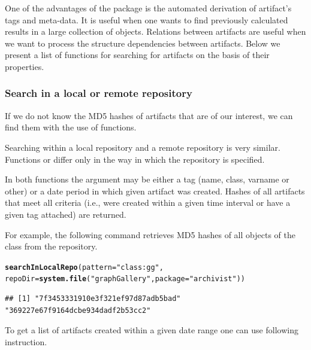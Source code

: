 \documentclass[nojss]{jss}\usepackage[]{graphicx}\usepackage[]{color}
\makeatletter
\newcommand{\hlstr}[1]{\textcolor[rgb]{0.192,0.494,0.8}{#1}}%
\newcommand{\hlstd}[1]{\textcolor[rgb]{0.345,0.345,0.345}{#1}}%
\newcommand{\hlkwc}[1]{\textcolor[rgb]{0.333,0.667,0.333}{#1}}%
\newcommand{\hlkwd}[1]{\textcolor[rgb]{0.737,0.353,0.396}{\textbf{#1}}}%
\newenvironment{kframe}{%
 \def\at@end@of@kframe{}%
 \ifinner\ifhmode%
  \def\at@end@of@kframe{\end{minipage}}%
  \begin{minipage}{\columnwidth}%
 \fi\fi%
 \def\FrameCommand##1{\hskip\@totalleftmargin \hskip-\fboxsep
 \colorbox{shadecolor}{##1}\hskip-\fboxsep
     \hskip-\linewidth \hskip-\@totalleftmargin \hskip\columnwidth}%
 \MakeFramed {\advance\hsize-\width
   \@totalleftmargin\z@ \linewidth\hsize
   \@setminipage}}%
 {\par\unskip\endMakeFramed%
 \at@end@of@kframe}
\newenvironment{knitrout}{}{} %
\makeatother
\begin{document}
One of the advantages of the  package is the automated derivation of artifact’s tags and meta-data. It is useful when one wants to find previously calculated results in a large collection of  objects. Relations between artifacts are useful when we want to process the structure dependencies between artifacts.
Below we present a list of functions for searching for artifacts on the basis of their properties.

\subsubsection{Search in a local or remote repository}

If we do not know the MD5 hashes of artifacts that are of our interest, we can find them with the use of  functions.

Searching within a local repository and a remote repository is very similar. Functions  or  differ only in the way in which the repository is specified.

In both functions the  argument may be either a tag (name, class, varname or other) or a date period in which given artifact was created. Hashes of all artifacts that meet all criteria (i.e., were created within a given time interval or have a given tag attached) are returned.

For example, the following command retrieves MD5 hashes of all objects of the class  from the  repository.

\begin{knitrout}
\color{fgcolor}\begin{kframe}
\begin{alltt}
\hlkwd{searchInLocalRepo}\hlstd{(}\hlkwc{pattern} \hlstd{=} \hlstr{"class:gg"}\hlstd{,}
    \hlkwc{repoDir} \hlstd{=} \hlkwd{system.file}\hlstd{(}\hlstr{"graphGallery"}\hlstd{,} \hlkwc{package} \hlstd{=} \hlstr{"archivist"}\hlstd{))}
\end{alltt}
\begin{verbatim}
## [1] "7f3453331910e3f321ef97d87adb5bad" "369227e67f9164dcbe934dadf2b53cc2"
\end{verbatim}
\end{kframe}
\end{knitrout}


To get a list of artifacts created within a given date range one can use following instruction.
\end{document}
